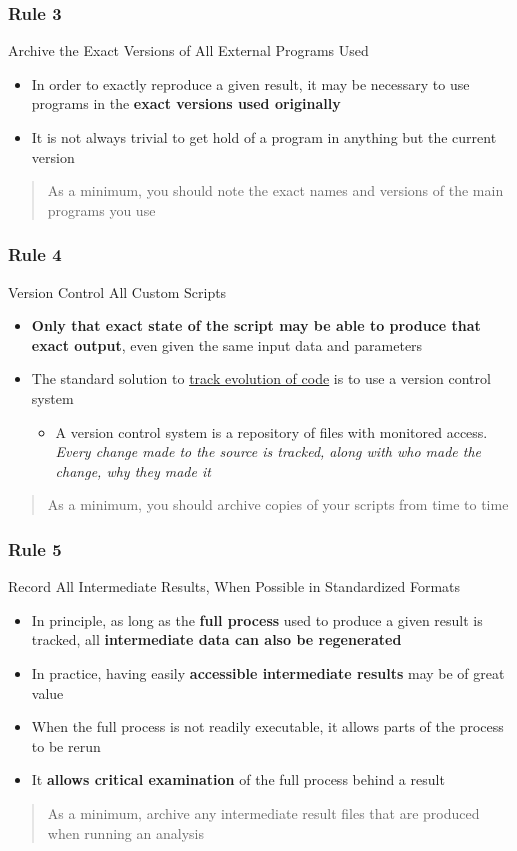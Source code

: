 \documentclass{beamer}
\begin{document}
\begin{frame}
\frametitle{Rule 3}
{\sc Archive the Exact Versions of All External Programs Used}
\pause
\begin{itemize}
	\item In order to exactly reproduce a given result, it may be necessary to use programs in the \textbf{exact versions used originally}
    \item It is not always trivial to get hold of a program in anything but the current version
\end{itemize}
\begin{quote}
    As a minimum, you should note the exact names and versions of the main programs you use
\end{quote}
\end{frame}
\begin{frame}
\frametitle{Rule 4}
{\sc Version Control All Custom Scripts}
\pause
\begin{itemize}
	\item \textbf{Only that exact state of the script may be able to produce that exact output}, even given the same input data and parameters
	\item The standard solution to \underline{track evolution of code} is to use a version control system
        \begin{itemize}[]
		\item \scriptsize A version control system is a repository of files with monitored access. \\ \textit{Every change made to the source is tracked, along with who made the change, why they made it}
        \end{itemize}
\end{itemize}
\begin{quote}
    As a minimum, you should archive copies of your scripts from time to time
\end{quote}
\end{frame}
\begin{frame}
\frametitle{Rule 5}
{\sc Record All Intermediate Results, When Possible in Standardized Formats}
\pause
\begin{itemize}
	\item In principle, as long as the \textbf{full process} used to produce a given result is tracked, all \textbf{intermediate data can also be regenerated}
	\item In practice, having easily \textbf{accessible intermediate results} may be of great value
    \item When the full process is not readily executable, it allows parts of the process to be rerun
    \item It \textbf{allows critical examination} of the full process behind a result
\end{itemize}
\begin{quote}
    As a minimum, archive any intermediate result files that are produced when running an analysis
\end{quote}
\end{frame}
\end{document}
